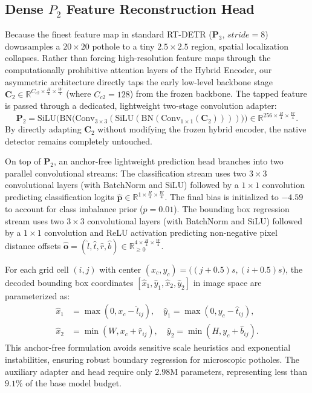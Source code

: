 \documentclass[runningheads]{llncs}
\begin{document}
\subsection{Dense $P_2$ Feature Reconstruction Head}
Because the finest feature map in standard RT-DETR ($\mathbf{P}_3$, $stride=8$) downsamples a $20 \times 20$ pothole to a tiny $2.5 \times 2.5$ region, spatial localization collapses. Rather than forcing high-resolution feature maps through the computationally prohibitive attention layers of the Hybrid Encoder, our asymmetric architecture directly taps the early low-level backbone stage $\mathbf{C}_2 \in \mathbb{R}^{C_{c2} \times \frac{H}{4} \times \frac{W}{4}}$ (where $C_{c2} = 128$) from the frozen backbone. The tapped feature is passed through a dedicated, lightweight two-stage convolution adapter:
\begin{equation}
    \mathbf{P}_2 = \text{SiLU}\Big( \text{BN}\big( \text{Conv}_{3\times 3}( \text{SiLU}( \text{BN}( \text{Conv}_{1\times 1}(\mathbf{C}_2) ) ) ) \big) \Big) \in \mathbb{R}^{256 \times \frac{H}{4} \times \frac{W}{4}}.
\end{equation}
By directly adapting $\mathbf{C}_2$ without modifying the frozen hybrid encoder, the native detector remains completely untouched.

On top of $\mathbf{P}_2$, an anchor-free lightweight prediction head \cite{tian2019fcos} branches into two parallel convolutional streams:
The classification stream uses two $3 \times 3$ convolutional layers (with BatchNorm and SiLU) followed by a $1 \times 1$ convolution predicting classification logits $\hat{\mathbf{p}} \in \mathbb{R}^{1 \times \frac{H}{4} \times \frac{W}{4}}$. The final bias is initialized to $-4.59$ to account for class imbalance prior ($p=0.01$).
The bounding box regression stream uses two $3 \times 3$ convolutional layers (with BatchNorm and SiLU) followed by a $1 \times 1$ convolution and ReLU activation predicting non-negative pixel distance offsets $\hat{\mathbf{o}} = (\hat{l}, \hat{t}, \hat{r}, \hat{b}) \in \mathbb{R}_{\ge 0}^{4 \times \frac{H}{4} \times \frac{W}{4}}$.

For each grid cell $(i, j)$ with center $(x_c, y_c) = \big((j + 0.5)s, (i + 0.5)s\big)$, the decoded bounding box coordinates $[\hat{x}_1, \hat{y}_1, \hat{x}_2, \hat{y}_2]$ in image space are parameterized as:
\begin{equation}
\begin{aligned}
    \hat{x}_1 &= \max(0, x_c - \hat{l}_{ij}), \quad \hat{y}_1 = \max(0, y_c - \hat{t}_{ij}), \\
    \hat{x}_2 &= \min(W, x_c + \hat{r}_{ij}), \quad \hat{y}_2 = \min(H, y_c + \hat{b}_{ij}).
\end{aligned}
\end{equation}
This anchor-free formulation avoids sensitive scale heuristics and exponential instabilities, ensuring robust boundary regression for microscopic potholes. The auxiliary adapter and head require only $2.98\text{M}$ parameters, representing less than $9.1\%$ of the base model budget.
\end{document}
